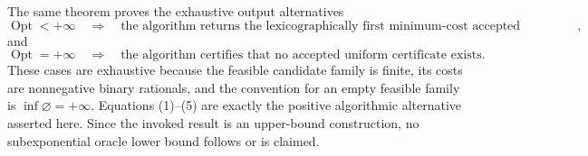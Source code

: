 The same theorem proves the exhaustive output alternatives
\[
  \operatorname{Opt}<+\infty
  \quad\Longrightarrow\quad
  \text{the algorithm returns the lexicographically first minimum-cost accepted certificate}, \tag{4}
\]
and
\[
  \operatorname{Opt}=+\infty
  \quad\Longrightarrow\quad
  \text{the algorithm certifies that no accepted uniform certificate exists}. \tag{5}
\]
These cases are exhaustive because the feasible candidate family is finite, its costs are nonnegative binary rationals, and the convention for an empty feasible family is \(\inf\varnothing=+\infty\).  Equations (1)--(5) are exactly the positive algorithmic alternative asserted here.  Since the invoked result is an upper-bound construction, no subexponential oracle lower bound follows or is claimed.
